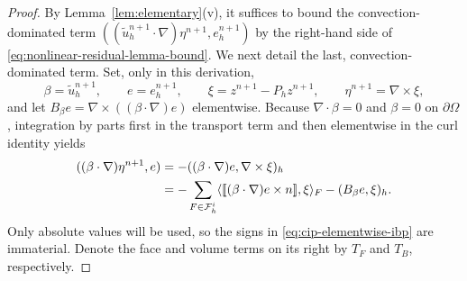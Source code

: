 \documentclass[11pt]{article}
\theoremstyle{remark}\newtheorem{remark}{Remark}
\newcommand{\tu}{\tilde u_h}
\newcommand{\Ph}{P_h}
\theoremstyle{plain}
\begin{document}
\begin{proof}
By Lemma~\ref{lem:elementary}(v), it suffices to bound the convection-dominated term $((\tu^{n+1}\cdot\nabla)\eta^{n+1},e_h^{n+1})$ by the right-hand side of \eqref{eq:nonlinear-residual-lemma-bound}.
We next detail the last, convection-dominated term. Set, only in this
derivation,
\[
\beta=\tu^{n+1},\qquad e=e_h^{n+1},\qquad
\xi=z^{n+1}-\Ph z^{n+1},\qquad
\eta^{n+1}=\nabla\times\xi,
\]
and let $B_\beta e=\nabla\times((\beta\cdot\nabla)e)$ elementwise.
Because $\nabla\cdot\beta=0$ and $\beta=0$ on $\partial\Omega$,
integration by parts first in the transport term and then elementwise in the
curl identity yields
\begin{align}
((\beta\cdot\nabla)\eta^{n+1},e)
&=-((\beta\cdot\nabla)e,\nabla\times\xi)_h \notag\\
&=-\sum_{F\in\mathcal F_h^i}
\langle[\![(\beta\cdot\nabla)e\times n]\!],\xi\rangle_F
-(B_\beta e,\xi)_h.
\label{eq:cip-elementwise-ibp}
\end{align}
Only absolute values will be used, so the signs in
\eqref{eq:cip-elementwise-ibp} are immaterial. Denote the face and volume
terms on its right by $T_F$ and $T_B$, respectively.


\end{proof}
\end{document}
